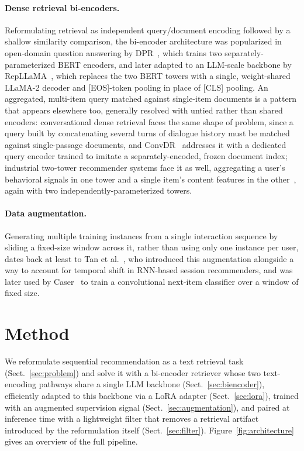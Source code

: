 \documentclass[runningheads]{llncs}
\begin{document}
\paragraph{Dense retrieval bi-encoders.}
Reformulating retrieval as independent query/document encoding followed by a shallow similarity comparison, the bi-encoder architecture was popularized in open-domain question answering by DPR~\cite{karpukhin2020}, which trains two separately-parameterized BERT encoders, and later adapted to an LLM-scale backbone by RepLLaMA~\cite{ma2024}, which replaces the two BERT towers with a single, weight-shared LLaMA-2 decoder and [EOS]-token pooling in place of [CLS] pooling. An aggregated, multi-item query matched against single-item documents is a pattern that appears elsewhere too, generally resolved with untied rather than shared encoders: conversational dense retrieval faces the same shape of problem, since a query built by concatenating several turns of dialogue history must be matched against single-passage documents, and ConvDR~\cite{yu2021} addresses it with a dedicated query encoder trained to imitate a separately-encoded, frozen document index; industrial two-tower recommender systems face it as well, aggregating a user's behavioral signals in one tower and a single item's content features in the other~\cite{yi2019}, again with two independently-parameterized towers.

\paragraph{Data augmentation.}
Generating multiple training instances from a single interaction sequence by sliding a fixed-size window across it, rather than using only one instance per user, dates back at least to Tan et al.~\cite{tan2016}, who introduced this augmentation alongside a way to account for temporal shift in RNN-based session recommenders, and was later used by Caser~\cite{tang2018} to train a convolutional next-item classifier over a window of fixed size.

\section{Method}
\label{sec:method}

We reformulate sequential recommendation as a text retrieval task (Sect.~\ref{sec:problem}) and solve it with a bi-encoder retriever whose two text-encoding pathways share a single LLM backbone (Sect.~\ref{sec:biencoder}), efficiently adapted to this backbone via a LoRA adapter (Sect.~\ref{sec:lora}), trained with an augmented supervision signal (Sect.~\ref{sec:augmentation}), and paired at inference time with a lightweight filter that removes a retrieval artifact introduced by the reformulation itself (Sect.~\ref{sec:filter}). Figure~\ref{fig:architecture} gives an overview of the full pipeline.
\end{document}
